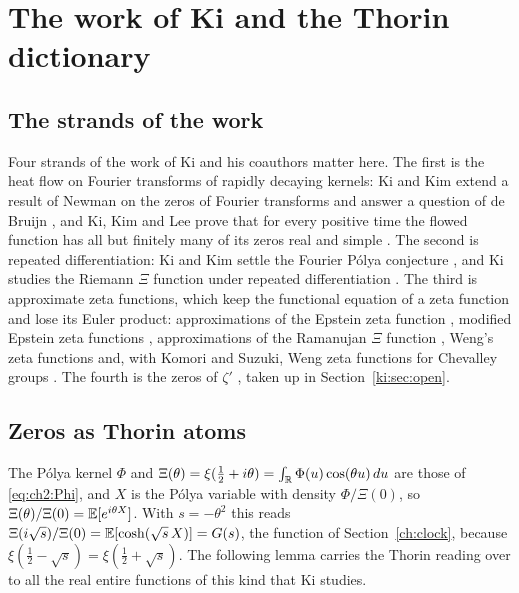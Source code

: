\section{The work of Ki and the Thorin dictionary}\label{ki:sec:dict}

\subsection{The strands of the work}

Four strands of the work of Ki and his coauthors matter here. The first is the heat flow on Fourier transforms of rapidly decaying kernels: Ki and Kim extend a result of Newman on the zeros of Fourier transforms \cite{KiKim02} and answer a question of de Bruijn \cite{KiKim03}, and Ki, Kim and Lee prove that for every positive time the flowed function has all but finitely many of its zeros real and simple \cite{KKL09}. %
The second is repeated differentiation: Ki and Kim settle the Fourier P\'olya conjecture \cite{KiKim00}, and Ki studies the Riemann $\Xi$ function under repeated differentiation \cite{Ki06b}. The third is approximate zeta functions, which keep the functional equation of a zeta function and lose its Euler product: approximations of the Epstein zeta function \cite{Ki05}, modified Epstein zeta functions \cite{Ki06a}, approximations of the Ramanujan $\Xi$ function \cite{Ki08a}, Weng's zeta functions \cite{Ki10} and, with Komori and Suzuki, Weng zeta functions for Chevalley groups \cite{KKS15}. The fourth is the zeros of $\zeta'$ \cite{Ki08b,FarmerKi12,GonekKi18}, taken up in Section~\ref{ki:sec:open}.

\subsection{Zeros as Thorin atoms}

The P\'olya kernel $\Phi$ and $\Xi(\theta)=\xi(\tfrac12+i\theta)=\int_{\mathbb{R}}\Phi(u)\cos(\theta u)\,du$ are those of \eqref{eq:ch2:Phi}, and $X$ is the P\'olya variable with density $\Phi/\Xi(0)$, so $\Xi(\theta)/\Xi(0)=\mathbb{E}[e^{i\theta X}]$. With $s=-\theta^2$ this reads $\Xi(i\sqrt s)/\Xi(0)=\mathbb{E}[\cosh(\sqrt s\,X)]=G(s)$, the function of Section~\ref{ch:clock}, because $\xi(\tfrac12-\sqrt s)=\xi(\tfrac12+\sqrt s)$. The following lemma carries the Thorin reading over to all the real entire functions of this kind that Ki studies.

